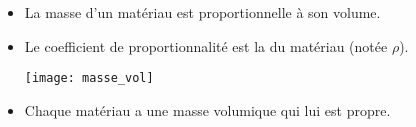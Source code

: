 \begin{mybilan}
	\begin{itemize}
		\item La masse d'un matériau est proportionnelle à son volume.
		\item Le coefficient de proportionnalité est la  du matériau (notée $\rho$).
		
		\begin{center}
			\texttt{[image: masse\_vol]}
		\end{center}
	
		\item Chaque matériau a une masse volumique qui lui est propre.
	\end{itemize}


\end{mybilan}